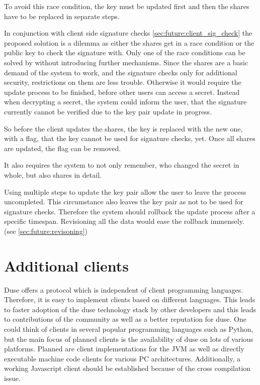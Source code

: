 To avoid this race condition, the key must be updated first and then the shares
have to be replaced in separate steps.

In conjunction with client side signature checks
\ref{sec:future:client_sig_check} the proposed solution is a dilemma as either
the shares get in a race condition or the public key to check the signature
with. Only one of the race conditions can be solved by without introducing
further mechanisms. Since the shares are a basic demand of the system to work,
and the signature checks only for additional security, restrictions on them are
less trouble. Otherwise it would require the update process to be finished,
before other users can access a secret. Instead when decrypting a secret, the
system could inform the user, that the signature currently cannot be verified
due to the key pair update in progress.

So before the client updates the shares, the key is replaced with the new one,
with a flag, that the key cannot be used for signature checks, yet. Once all
shares are updated, the flag can be removed.

It also requires the system to not only remember, who changed the secret in
whole, but also shares in detail.

Using multiple steps to update the key pair allow the user to leave the process
uncompleted. This circumstance also leaves the key pair as not to be used for
signature checks. Therefore the system should rollback the update process after
a specific timespan. Revisioning all the data would ease the rollback
immensely. (see \ref{sec:future:revisoning})

\section{Additional clients}

Duse offers a protocol which is independent of client programming languages.
Therefore, it is easy to implement clients based on different
languages. This leads to faster adoption of the duse technology stack by
other developers and this leads to contributions of the community as well
as a better reputation for duse. One could think of clients in several
popular programming languages such as Python, but the main focus of planned
clients is the availability of duse on lots of various platforms.
Planned are client implementations for the JVM as well as directly executable
machine code clients for various PC architectures. Additionally, a working
Javascript client should be established because of the cross compilation issue.

